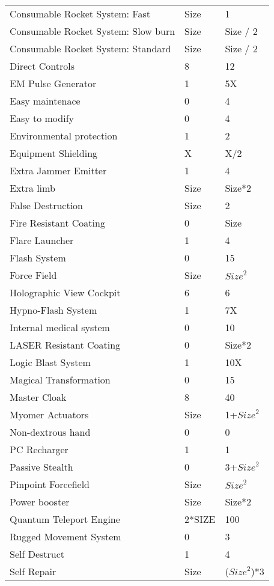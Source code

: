 \documentclass[twoside]{book}
\begin{document}
\begin{longtable}{p{1.25in}ll}
      \raggedright  Consumable Rocket System: Fast& Size& 1\tabularnewline
      \raggedright  Consumable Rocket System: Slow
           burn& Size& Size / 2\tabularnewline
      \raggedright  Consumable Rocket System:
           Standard& Size& Size / 2\tabularnewline
      \raggedright  Direct Controls& 8& 12\tabularnewline
      \raggedright  EM Pulse Generator& 1& 5X\tabularnewline
      \raggedright  Easy maintenace& 0& 4\tabularnewline
      \raggedright  Easy to modify& 0& 4\tabularnewline
      \raggedright  Environmental protection& 1& 2\tabularnewline
      \raggedright  Equipment Shielding& X& X/2\tabularnewline
      \raggedright  Extra Jammer Emitter& 1& 4\tabularnewline
      \raggedright  Extra limb& Size& Size*2\tabularnewline
      \raggedright  False Destruction& Size& 2\tabularnewline
      \raggedright  Fire Resistant Coating& 0& Size\tabularnewline
      \raggedright  Flare Launcher& 1& 4\tabularnewline
      \raggedright  Flash System& 0& 15\tabularnewline
      \raggedright  Force Field& Size& \begin{math}{Size}^{2}\end{math}\tabularnewline
      \raggedright  Holographic View Cockpit& 6& 6\tabularnewline
      \raggedright  Hypno-Flash System& 1& 7X\tabularnewline
      \raggedright  Internal medical system& 0& 10\tabularnewline
      \raggedright  LASER Resistant Coating& 0& Size*2\tabularnewline
      \raggedright  Logic Blast System& 1& 10X\tabularnewline
      \raggedright  Magical Transformation& 0& 15\tabularnewline
      \raggedright  Master Cloak& 8& 40\tabularnewline
      \raggedright  Myomer Actuators& Size& 1+\begin{math}{Size}^{2}\end{math}\tabularnewline
      \raggedright  Non-dextrous hand& 0& 0\tabularnewline
      \raggedright  PC Recharger& 1& 1\tabularnewline
      \raggedright  Passive Stealth& 0& 3+\begin{math}{Size}^{2}\end{math}\tabularnewline
      \raggedright  Pinpoint Forcefield& Size& \begin{math}{Size}^{2}\end{math}\tabularnewline
      \raggedright  Power booster& Size& Size*2\tabularnewline
      \raggedright  Quantum Teleport Engine& 2*SIZE& 100\tabularnewline
      \raggedright  Rugged Movement System& 0& 3\tabularnewline
      \raggedright  Self Destruct& 1& 4\tabularnewline
      \raggedright  Self Repair& Size& (\begin{math}{Size}^{2}\end{math})*3\tabularnewline

\end{longtable}
\end{document}
